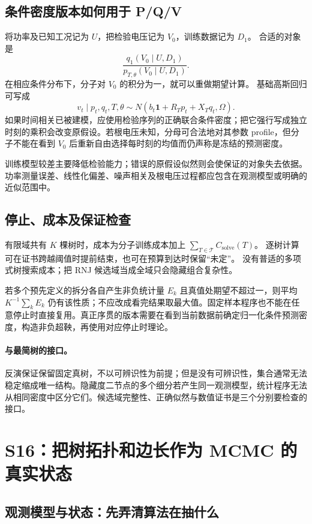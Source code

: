 \subsection{条件密度版本如何用于 P/Q/V}

将功率及已知工况记为 $U$，把检验电压记为 $V_0$，训练数据记为 $D_1$。
合适的对象是
\[
 \frac{q_1(V_0\mid U,D_1)}
 {p_{T,\theta}(V_0\mid U,D_1)}.
\]
在相应条件分布下，分子对 $V_0$ 的积分为一，就可以重做期望计算。
基础高斯回归可写成
\[
 v_t\mid p_t,q_t,T,\theta
 \sim N(b_t\mathbf1+R_Tp_t+X_Tq_t,\Omega).
\]
如果时间相关已被建模，应使用检验序列的正确联合条件密度；把它强行写成独立时刻的乘积会改变原假设。若根电压未知，分母可合法地对其参数 profile，但分子不能在看到 $V_0$ 后重新自由选择每时刻的均值而仍声称是冻结的预测密度。

训练模型较差主要降低检验能力；错误的原假设似然则会使保证的对象失去依据。功率测量误差、线性化偏差、噪声相关及根电压过程都应包含在观测模型或明确的近似范围中。

\subsection{停止、成本及保证检查}

有限域共有 $K$ 棵树时，成本为分子训练成本加上
$\sum_{T\in\mathcal T}C_{\mathrm{solve}}(T)$。
逐树计算可在证书跨越阈值时提前结束，也可在预算到达时保留“未定”。
没有普适的多项式树搜索成本；把 RNJ 候选域当成全域只会隐藏组合复杂性。

若多个预先定义的拆分各自产生非负统计量 $E_k$ 且真值处期望不超过一，则平均
$K^{-1}\sum_kE_k$ 仍有该性质；不应改成看完结果取最大值。固定样本程序也不能在任意停止时直接复用。真正序贯的版本需要在看到当前数据前确定归一化条件预测密度，构造非负超鞅，再使用对应停止时理论。

\paragraph{与最简树的接口。}
反演保证保留固定真树，不以可辨识性为前提；但是没有可辨识性，集合通常无法稳定缩成唯一结构。隐藏度二节点的多个细分若产生同一观测模型，统计程序无法从相同密度中区分它们。候选域完整性、正确似然与数值证书是三个分别要检查的接口。

\section{S16：把树拓扑和边长作为 MCMC 的真实状态}
\label{sec:textbook-S16}

\subsection{观测模型与状态：先弄清算法在抽什么}

